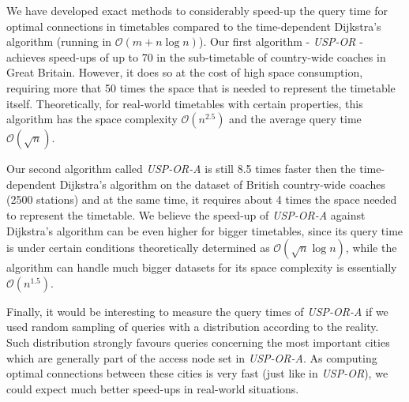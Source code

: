 We have developed exact methods to considerably speed-up the query time for optimal connections in timetables compared to the time-dependent Dijkstra's algorithm (running in $\mathcal{O}(m + n \log n)$). Our first algorithm - \textit{USP-OR} - achieves speed-ups of up to 70 in the sub-timetable of country-wide coaches in Great Britain. However, it does so at the cost of high space consumption, requiring more that 50 times the space that is needed to represent the timetable itself. Theoretically, for real-world timetables with certain properties, this algorithm has the space complexity $\mathcal{O}(n^{2.5})$ and the average query time $\mathcal{O}(\sqrt{n})$.
	
Our second algorithm called \textit{USP-OR-A} is still 8.5 times faster then the time-dependent Dijkstra's algorithm on the dataset of British country-wide coaches (2500 stations) and at the same time, it requires about 4 times the space needed to represent the timetable. We believe the speed-up of \textit{USP-OR-A} against Dijkstra's algorithm can be even higher for bigger timetables, since its query time is under certain conditions theoretically determined as $\mathcal{O}(\sqrt{n} \log n)$, while the algorithm can handle much bigger datasets for its space complexity is essentially $\mathcal{O}(n^{1.5})$. 
	
Finally, it would be interesting to measure the query times of \textit{USP-OR-A} if we used random sampling of queries with a distribution according to the reality. Such distribution strongly favours queries concerning the most important cities which are generally part of the access node set in \textit{USP-OR-A}. As computing optimal connections between these cities is very fast (just like in \textit{USP-OR}), we could expect much better speed-ups in real-world situations.